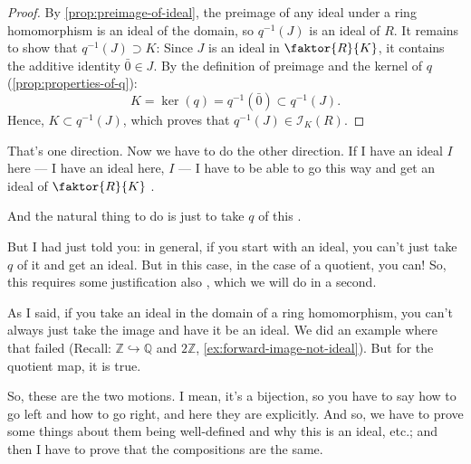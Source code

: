 \begin{proofWrapper}
\begin{content}

\begin{proof}
By \cref{prop:preimage-of-ideal}, the preimage of any ideal under a ring homomorphism is an ideal of the domain, so $q^{-1}(J)$ is an ideal of $R$.
It remains to show that $q^{-1}(J) \supset K$:
Since $J$ is an ideal in $\faktor{R}{K}$, it contains the additive identity $\bar{0} \in J$. By the definition of preimage and the kernel of $q$ (\cref{prop:properties-of-q}):
\[
K = \ker(q) = q^{-1}(\bar{0}) \subset q^{-1}(J).
\]
Hence, $K \subset q^{-1}(J)$, which proves that $q^{-1}(J) \in \mathscr{I}_K(R)$.
\end{proof}
\end{content}

\begin{speech}[00:22:05 - 00:23:35]
That's one direction. Now we have to do the other direction. If I have an ideal $I$ here  --- I have an ideal here, $I$ --- I have to be able to go this way and get an ideal of $\faktor{R}{K}$ .

And the natural thing to do is just to take $q$ of this .

But I had just told you: in general, if you start with an ideal, you can't just take $q$ of it and get an ideal. But in this case, in the case of a quotient, you can! So, this requires some justification also , which we will do in a second.

As I said, if you take an ideal in the domain of a ring homomorphism, you can't always just take the image and have it be an ideal. We did an example where that failed (Recall: $\mathbb{Z} \hookrightarrow \mathbb{Q}$ and $2\mathbb{Z}$, \cref{ex:forward-image-not-ideal}). But for the quotient map, it is true.

So, these are the two motions. I mean, it's a bijection, so you have to say how to go left and how to go right, and here they are explicitly. And so, we have to prove some things about them being well-defined and why this is an ideal, etc.; and then I have to prove that the compositions are the same.


\end{speech}
\end{proofWrapper}
